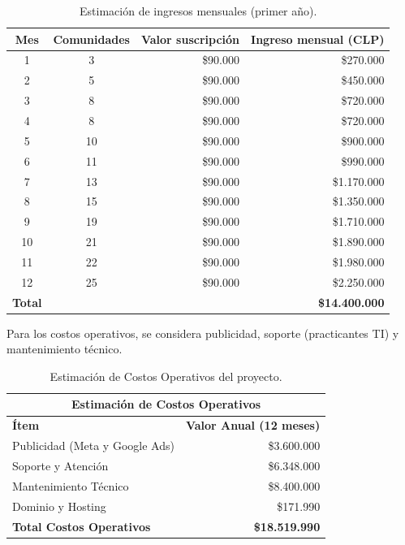 \begin{table}[H]
    \centering
    \caption{Estimación de ingresos mensuales (primer año).}
    \label{tab:ingresos_y1}
    \begin{tabular}{|c|c|r|r|}
    \hline
    \textbf{Mes} & \textbf{Comunidades} & \textbf{Valor suscripción} & \textbf{Ingreso mensual (CLP)}\\
    \hline
    1 & 3 & \$90.000 & \$270.000\\
    2 & 5 & \$90.000 & \$450.000\\
    3 & 8 & \$90.000 & \$720.000\\
    4 & 8 & \$90.000 & \$720.000\\
    5 & 10 & \$90.000 & \$900.000\\
    6 & 11 & \$90.000 & \$990.000\\
    7 & 13 & \$90.000 & \$1.170.000\\
    8 & 15 & \$90.000 & \$1.350.000\\
    9 & 19 & \$90.000 & \$1.710.000\\
    10 & 21 & \$90.000 & \$1.890.000\\
    11 & 22 & \$90.000 & \$1.980.000\\
    12 & 25 & \$90.000 & \$2.250.000\\
    \hline
    \textbf{Total} & & & \textbf{\$14.400.000}\\
    \hline
    \end{tabular}
\end{table}

Para los costos operativos, se considera publicidad, soporte (practicantes TI) y mantenimiento técnico.

\begin{table}[H]
    \centering
    \caption{Estimación de Costos Operativos del proyecto.}
    \label{tab:costos_operativos_y1}
    \begin{tabular}{|l|r|}
    \hline
    \multicolumn{2}{|c|}{\textbf{Estimación de Costos Operativos}}\\
    \hline
    \textbf{Ítem} & \textbf{Valor Anual (12 meses)}\\
    \hline
    Publicidad (Meta y Google Ads) & \$3.600.000\\
    \hline
    Soporte y Atención & \$6.348.000\\
    \hline
    Mantenimiento Técnico & \$8.400.000\\
    \hline
    Dominio y Hosting & \$171.990\\
    \hline
    \textbf{Total Costos Operativos} & \textbf{\$18.519.990}\\
    \hline
    \end{tabular}
\end{table}

